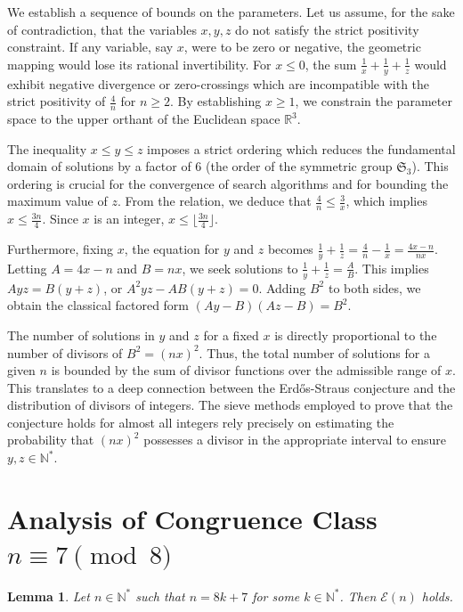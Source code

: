\documentclass[12pt, a4paper]{article}
\newtheorem{lemma}[theorem]{Lemma}
\theoremstyle{definition}
\theoremstyle{remark}
\begin{document}
We establish a sequence of bounds on the parameters. Let us assume, for the sake of contradiction, that the variables $x, y, z$ do not satisfy the strict positivity constraint. If any variable, say $x$, were to be zero or negative, the geometric mapping would lose its rational invertibility. For $x \le 0$, the sum $\frac{1}{x} + \frac{1}{y} + \frac{1}{z}$ would exhibit negative divergence or zero-crossings which are incompatible with the strict positivity of $\frac{4}{n}$ for $n \ge 2$. By establishing $x \ge 1$, we constrain the parameter space to the upper orthant of the Euclidean space $\mathbb{R}^3$.

The inequality $x \le y \le z$ imposes a strict ordering which reduces the fundamental domain of solutions by a factor of 6 (the order of the symmetric group $\mathfrak{S}_3$). This ordering is crucial for the convergence of search algorithms and for bounding the maximum value of $z$. From the relation, we deduce that $\frac{4}{n} \le \frac{3}{x}$, which implies $x \le \frac{3n}{4}$. Since $x$ is an integer, $x \le \lfloor \frac{3n}{4} \rfloor$.

Furthermore, fixing $x$, the equation for $y$ and $z$ becomes $\frac{1}{y} + \frac{1}{z} = \frac{4}{n} - \frac{1}{x} = \frac{4x - n}{nx}$. Letting $A = 4x - n$ and $B = nx$, we seek solutions to $\frac{1}{y} + \frac{1}{z} = \frac{A}{B}$. This implies $Ayz = B(y+z)$, or $A^2 y z - AB(y+z) = 0$. Adding $B^2$ to both sides, we obtain the classical factored form $(Ay - B)(Az - B) = B^2$.

The number of solutions in $y$ and $z$ for a fixed $x$ is directly proportional to the number of divisors of $B^2 = (nx)^2$. Thus, the total number of solutions for a given $n$ is bounded by the sum of divisor functions over the admissible range of $x$. This translates to a deep connection between the Erd\H{o}s-Straus conjecture and the distribution of divisors of integers. The sieve methods employed to prove that the conjecture holds for almost all integers rely precisely on estimating the probability that $(nx)^2$ possesses a divisor in the appropriate interval to ensure $y, z \in \mathbb{N}^*$.

\section{Analysis of Congruence Class $n \equiv 7 \pmod 8$}

\begin{lemma}
Let $n \in \mathbb{N}^*$ such that $n = 8k + 7$ for some $k \in \mathbb{N}^*$. Then $\mathcal{E}(n)$ holds.
\end{lemma}
\end{document}
